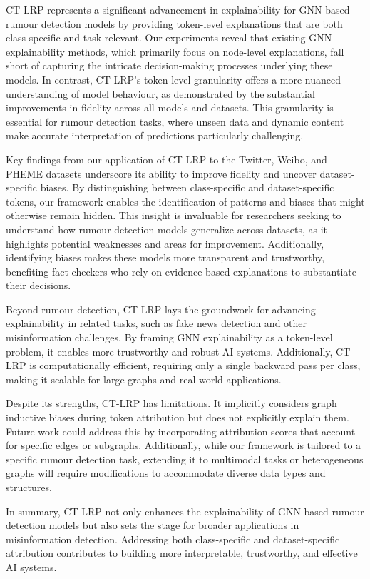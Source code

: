 CT-LRP represents a significant advancement in explainability for GNN-based rumour detection models by providing token-level explanations that are both class-specific and task-relevant. Our experiments reveal that existing GNN explainability methods, which primarily focus on node-level explanations, fall short of capturing the intricate decision-making processes underlying these models. In contrast, CT-LRP's token-level granularity offers a more nuanced understanding of model behaviour, as demonstrated by the substantial improvements in fidelity across all models and datasets. This granularity is essential for rumour detection tasks, where unseen data and dynamic content make accurate interpretation of predictions particularly challenging. 

Key findings from our application of CT-LRP to the Twitter, Weibo, and PHEME datasets underscore its ability to improve fidelity and uncover dataset-specific biases. By distinguishing between class-specific and dataset-specific tokens, our framework enables the identification of patterns and biases that might otherwise remain hidden. This insight is invaluable for researchers seeking to understand how rumour detection models generalize across datasets, as it highlights potential weaknesses and areas for improvement. Additionally, identifying biases makes these models more transparent and trustworthy, benefiting fact-checkers who rely on evidence-based explanations to substantiate their decisions.

Beyond rumour detection, CT-LRP lays the groundwork for advancing explainability in related tasks, such as fake news detection and other misinformation challenges. By framing GNN explainability as a token-level problem, it enables more trustworthy and robust AI systems. Additionally, CT-LRP is computationally efficient, requiring only a single backward pass per class, making it scalable for large graphs and real-world applications.

Despite its strengths, CT-LRP has limitations. It implicitly considers graph inductive biases during token attribution but does not explicitly explain them. Future work could address this by incorporating attribution scores that account for specific edges or subgraphs. Additionally, while our framework is tailored to a specific rumour detection task, extending it to multimodal tasks or heterogeneous graphs will require modifications to accommodate diverse data types and structures.

In summary, CT-LRP not only enhances the explainability of GNN-based rumour detection models but also sets the stage for broader applications in misinformation detection. Addressing both class-specific and dataset-specific attribution contributes to building more interpretable, trustworthy, and effective AI systems.


